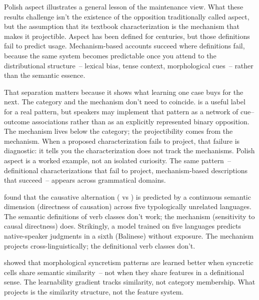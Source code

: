 Polish aspect illustrates a general lesson of the maintenance view. What these results challenge isn't the existence of the opposition traditionally called aspect, but the assumption that its textbook characterization is the mechanism that makes it projectible. Aspect has been defined for centuries, but those definitions fail to predict usage. Mechanism-based accounts succeed where definitions fail, because the same system becomes predictable once you attend to the distributional structure~-- lexical bias, tense context, morphological cues~-- rather than the semantic essence.

That separation matters because it shows what learning one case buys for the next. The category and the mechanism don't need to coincide.  is a useful label for a real pattern, but speakers may implement that pattern as a network of cue--outcome associations rather than as an explicitly represented binary opposition. The mechanism lives below the category; the projectibility comes from the mechanism. When a proposed characterization fails to project, that failure is diagnostic: it tells you the characterization does not track the mechanisms. Polish aspect is a worked example, not an isolated curiosity. The same pattern~-- definitional characterizations that fail to project, mechanism-based descriptions that succeed~-- appears across grammatical domains.

\textcite{ambridge2020} found that the causative alternation ( vs \ungram{}) is predicted by a continuous semantic dimension (directness of causation) across five typologically unrelated languages. The semantic definitions of verb classes don't work; the mechanism (sensitivity to causal directness) does. Strikingly, a model trained on five languages predicts native-speaker judgments in a sixth (Balinese) without exposure. The mechanism projects cross-linguistically; the definitional verb classes don't.

\textcite{saldana2022} showed that morphological syncretism patterns are learned better when syncretic cells share semantic similarity~-- not when they share features in a definitional sense. The learnability gradient tracks similarity, not category membership. What projects is the similarity structure, not the feature system.

